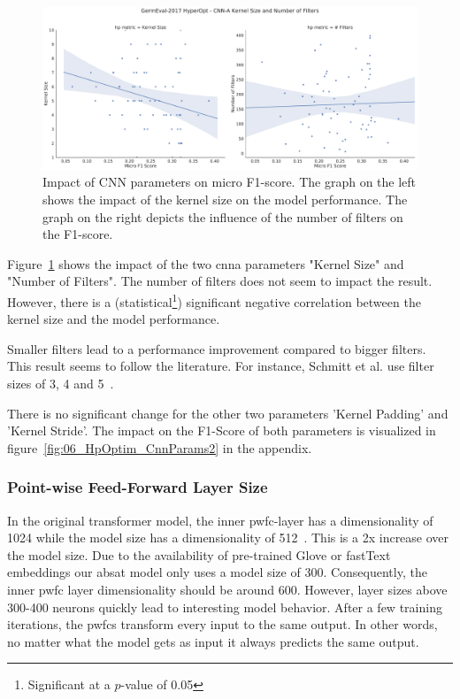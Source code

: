 \begin{figure}[ht]
    \centering
    \includegraphics[width=\textwidth]{figures/06_results/06_hp_ge_lm_cnnParams_test}
    \caption{Impact of CNN parameters on micro F1-score. The graph on the left shows the impact of the kernel size on the model performance. The graph on the right depicts the influence of the number of filters on the F1-score.}
    \label{fig:06_HpOptim_CnnParams}
\end{figure}

Figure~\ref{fig:06_HpOptim_CnnParams} shows the impact of the two \gls{cnna} parameters "Kernel Size" and "Number of Filters". The number of filters does not seem to impact the result. However, there is a {(statistical\footnote{Significant at a $p$-value of 0.05})} significant negative correlation between the kernel size and the model performance. 

Smaller filters lead to a performance improvement compared to bigger filters. This result seems to follow the literature. For instance, Schmitt et al. use filter sizes of 3, 4 and 5~\cite{Schmitt2018}.
\medskip

There is no significant change for the other two parameters 'Kernel Padding' and 'Kernel Stride'. The impact on the F1-Score of both parameters is visualized in figure~\ref{fig:06_HpOptim_CnnParams2} in the appendix.

\subsubsection{Point-wise Feed-Forward Layer Size}

In the original transformer model, the inner \gls{pwfc}-layer has a dimensionality of 1024 while the model size has a dimensionality of 512~\cite{Vaswani2017c}. This is a 2x increase over the model size. Due to the availability of pre-trained Glove or fastText embeddings our \gls{absat} model only uses a model size of 300. Consequently, the inner \gls{pwfc} layer dimensionality should be around 600. However, layer sizes above 300-400 neurons quickly lead to interesting model behavior. After a few training iterations, the \glspl{pwfc} transform every input to the same output. In other words, no matter what the model gets as input it always predicts the same output.
\medskip

